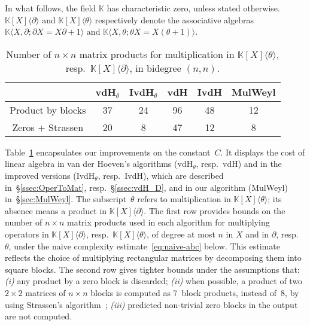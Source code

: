 \documentclass{sig-alt-full}
\newcommand{\x}{X}
\newcommand{\Tx}{\theta}
\newcommand{\Dx}{\partial}
\newcommand{\bK}{\mathbb{K}}
\begin{document}
In what follows, the field $\bK$ has characteristic zero, unless stated otherwise.
$\bK[\x]\langle\Dx\rangle$ and $\bK[\x]\langle\Tx\rangle$ respectively denote the associative algebras $\bK\langle\x,\Dx;\Dx\x=\x\Dx+1\rangle$ and $\bK\langle\x,\Tx;\Tx\x= \x(\Tx+1)\rangle$.

\vspace{-0.3cm}
\begin{table}[ht]
\begin{center}
\setlength{\tabcolsep}{3pt}
\begin{tabular}[t]{c|cc|ccc}
 & \textsf{vdH${}_\Tx$}  & \textsf{IvdH${}_\Tx$} & \textsf{vdH} & \textsf{IvdH} & \textsf{MulWeyl}\\
\hline
Product by blocks & 37 & 24 & 96 & 48 & 12 \\
\hline
Zeros + Strassen  & 20 &  8 & 47 & 12 &  8
\end{tabular}
\caption{\label{table:MM} Number of $n \times n$ matrix products for multiplication in $\bK[\x]\langle\Tx\rangle$, resp.~$\bK[\x]\langle\Dx\rangle$, in bidegree $(n,n)$.}
\end{center}
\end{table}


\vspace{-0.5cm}
Table~\ref{table:MM} encapsulates our improvements on the constant~$C$.
It displays the cost of linear algebra in van der Hoeven's algorithms (\textsf{vdH${}_\Tx$}, resp.~\textsf{vdH})
and in the improved versions (\textsf{IvdH${}_\Tx$}, resp.~\textsf{IvdH}), which are described in~\S\ref{ssec:OperToMat}, resp.~\S\ref{ssec:vdH_D}, and in our algorithm (\textsf{MulWeyl}) in~\S\ref{sec:MulWeyl}.
The subscript~$\Tx$ refers to multiplication in $\bK[\x]\langle\Tx\rangle$;
its absence means a product in $\bK[\x]\langle\Dx\rangle$. 
The first row provides bounds on the number of $n \times n$ matrix products used in each algorithm for multiplying operators in $\bK[\x]\langle\Dx\rangle$, resp.~$\bK[\x]\langle\Tx\rangle$, of degree at most $n$ in $\x$ and in $\Dx$, resp.~$\Tx$,
under the naive complexity estimate~\eqref{eq:naive-abc} below. 
This estimate reflects the choice of multiplying rectangular matrices by decomposing them into square blocks.
The second row gives tighter bounds under the assumptions that: \emph{(i)\/} any product by a zero block is discarded; \emph{(ii)\/} when possible, a product of two $2\times2$ matrices of $n\times n$ blocks is computed as 7~block products, instead of~8, by using Strassen's algorithm~\cite{Strassen69};
\emph{(iii)\/} predicted non-trivial zero blocks in the output are not computed.
\end{document}
